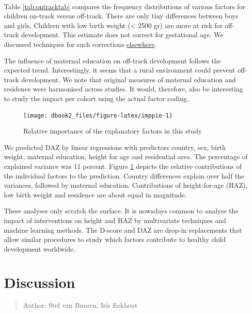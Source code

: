 \documentclass[
]{book}
\begin{document}
~

Table \ref{tab:ontracktab} compares the frequency distributions of various factors for children on-track versus off-track. There are only tiny differences between boys and girls. Children with low birth weight (\textless{} 2500 gr) are more at risk for off-track development. This estimate does not correct for gestational age. We discussed techniques for such corrections \href{https://d-score.org/dbook1/sec-pops.html}{elsewhere}.

The influence of maternal education on off-track development follows the expected trend. Interestingly, it seems that a rural environment could prevent off-track development. We note that original measures of maternal education and residence were harmonised across studies. It would, therefore, also be interesting to study the impact per cohort using the actual factor coding.

\begin{figure}

{\centering \texttt{[image: dbook2\_files/figure-latex/imppie-1]} 

}

\caption{Relative importance of the explanatory factors in this study}\label{fig:imppie}
\end{figure}



We predicted DAZ by linear regressions with predictors country, sex, birth weight, maternal education, height for age and residential area. The percentage of explained variance was 11 percent. Figure \ref{fig:imppie} depicts the relative contributions of the individual factors to the prediction. Country differences explain over half the variances, followed by maternal education. Contributions of height-for-age (HAZ), low birth weight and residence are about equal in magnitude.

These analyses only scratch the surface. It is nowadays common to analyse the impact of interventions on height and HAZ by multivariate techniques and machine learning methods. The D-score and DAZ are drop-in replacements that allow similar procedures to study which factors contribute to healthy child development worldwide.

\hypertarget{ch:discussion2}{%
\chapter{Discussion}\label{ch:discussion2}}

\begin{quote}
Author: Stef van Buuren, Iris Eekhout
\end{quote}
\end{document}
